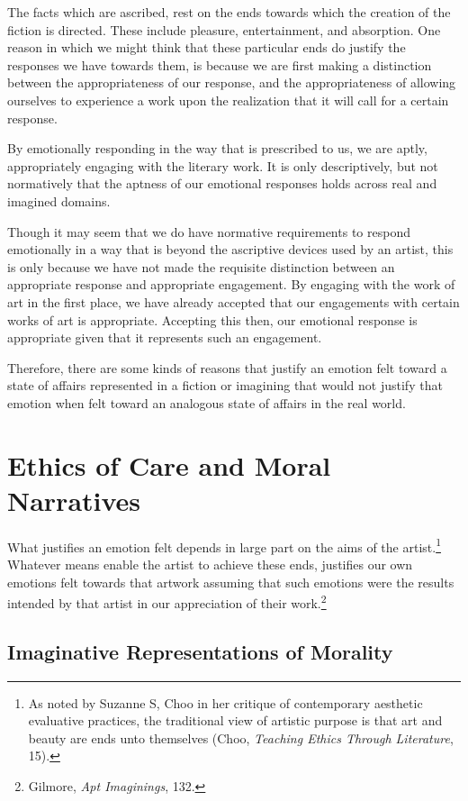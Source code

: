 \documentclass[phdthesis,12pt,final]{wuthesis}
\theoremstyle{definition}
\theoremstyle{definition}
\theoremstyle{definition}
\theoremstyle{definition}
\theoremstyle{remark}
\begin{document}
The facts which are ascribed, rest on the ends towards which the creation of the fiction is directed. These include pleasure, entertainment, and absorption. One reason in which we might think that these particular ends do justify the responses we have towards them, is because we are first making a distinction between the appropriateness of our response, and the appropriateness of allowing ourselves to experience a work upon the realization that it will call for a certain response.

By emotionally responding in the way that is prescribed to us, we are aptly, appropriately engaging with the literary work. It is only descriptively, but not normatively that the aptness of our emotional responses holds across real and imagined domains.

Though it may seem that we do have normative requirements to respond emotionally in a way that is beyond the ascriptive devices used by an artist, this is only because we have not made the requisite distinction between an appropriate response and appropriate engagement. By engaging with the work of art in the first place, we have already accepted that our engagements with certain works of art is appropriate. Accepting this then, our emotional response is appropriate given that it represents such an engagement.

Therefore, there are some kinds of reasons that justify an emotion felt toward a state of affairs represented in a fiction or imagining that would not justify that emotion when felt toward an analogous state of affairs in the real world.

\section{Ethics of Care and Moral Narratives}\label{ethics-of-care-and-moral-narratives}

What justifies an emotion felt depends in large part on the aims of the artist.\footnote{As noted by Suzanne S, Choo in her critique of contemporary aesthetic evaluative practices, the traditional view of artistic purpose is that art and beauty are ends unto themselves (Choo, \emph{Teaching Ethics Through Literature}, 15).} Whatever means enable the artist to achieve these ends, justifies our own emotions felt towards that artwork assuming that such emotions were the results intended by that artist in our appreciation of their work.\footnote{Gilmore, \emph{Apt {Imaginings}}, 132.}

\subsection*{Imaginative Representations of Morality}\label{imaginative-representations-of-morality}
\end{document}
